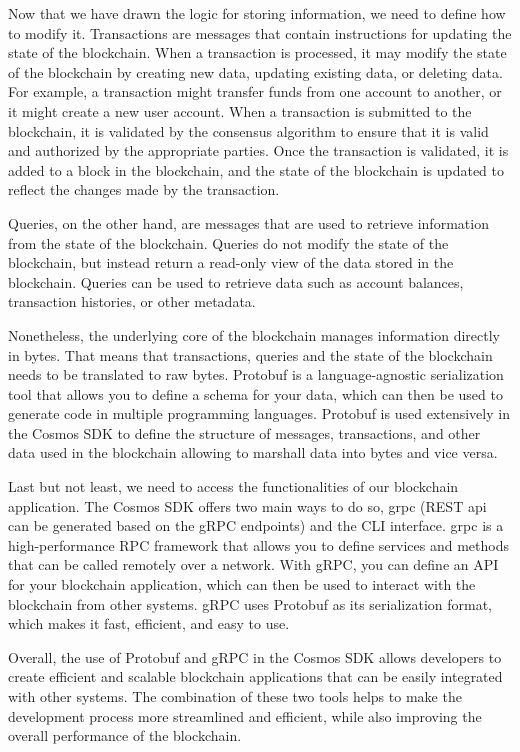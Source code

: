 Now that we have drawn the logic for storing information, we need to define how to modify it. Transactions are messages that contain instructions for updating the state of the blockchain. When a transaction is processed, it may modify the state of the blockchain by creating new data, updating existing data, or deleting data. For example, a transaction might transfer funds from one account to another, or it might create a new user account. When a transaction is submitted to the blockchain, it is validated by the consensus algorithm to ensure that it is valid and authorized by the appropriate parties. Once the transaction is validated, it is added to a block in the blockchain, and the state of the blockchain is updated to reflect the changes made by the transaction.

Queries, on the other hand, are messages that are used to retrieve information from the state of the blockchain. Queries do not modify the state of the blockchain, but instead return a read-only view of the data stored in the blockchain. Queries can be used to retrieve data such as account balances, transaction histories, or other metadata.

Nonetheless, the underlying core of the blockchain manages information directly in bytes. That means that transactions, queries and the state of the blockchain needs to be translated to raw bytes. Protobuf is a language-agnostic serialization tool that allows you to define a schema for your data, which can then be used to generate code in multiple programming languages. Protobuf is used extensively in the Cosmos SDK to define the structure of messages, transactions, and other data used in the blockchain allowing to marshall data into bytes and vice versa.

Last but not least, we need to access the functionalities of our blockchain application. The Cosmos SDK offers two main ways to do so, \gls{grpc} (REST api can be generated based on the gRPC endpoints) and the CLI interface. \gls{grpc} is a high-performance RPC framework that allows you to define services and methods that can be called remotely over a network\cite{gRPC-website}. With gRPC, you can define an API for your blockchain application, which can then be used to interact with the blockchain from other systems. gRPC uses Protobuf as its serialization format, which makes it fast, efficient, and easy to use.

Overall, the use of Protobuf and gRPC in the Cosmos SDK allows developers to create efficient and scalable blockchain applications that can be easily integrated with other systems. The combination of these two tools helps to make the development process more streamlined and efficient, while also improving the overall performance of the blockchain.

